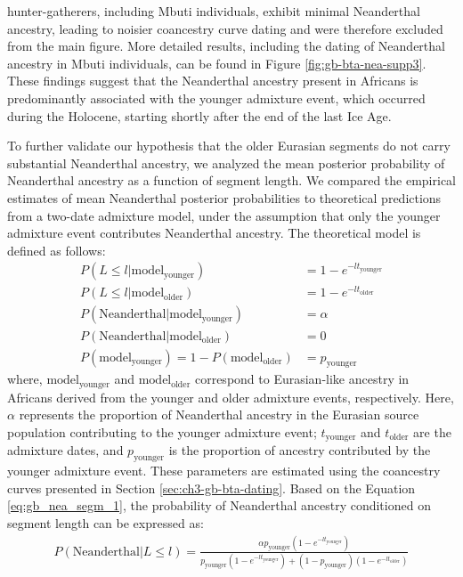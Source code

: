 hunter-gatherers, including Mbuti individuals, exhibit minimal Neanderthal ancestry, leading to noisier coancestry curve dating and were therefore excluded from the main figure. More detailed results, including the dating of Neanderthal ancestry in Mbuti individuals, can be found in Figure \ref{fig:gb-bta-nea-supp3}. These findings suggest that the Neanderthal ancestry present in Africans is predominantly associated with the younger admixture event, which occurred during the Holocene, starting shortly after the end of the last Ice Age.

To further validate our hypothesis that the older Eurasian segments do not carry substantial Neanderthal ancestry, we analyzed the mean posterior probability of Neanderthal ancestry as a function of segment length. We compared the empirical estimates of mean Neanderthal posterior probabilities to theoretical predictions from a two-date admixture model, under the assumption that only the younger admixture event contributes Neanderthal ancestry. The theoretical model is defined as follows:
\begin{align}
    P ( L \leq l | \text{model}_{\text{younger}}) &= 1 - e^{-lt_{\text{younger}}} \nonumber \\
    P ( L \leq l | \text{model}_{\text{older}}) &= 1 - e^{-lt_{\text{older}}} \nonumber \\
    P ( \text{Neanderthal} | \text{model}_{\text{younger}}) &= \alpha \nonumber \\
    P ( \text{Neanderthal} | \text{model}_{\text{older}}) &= 0 \nonumber \\
    P ( \text{model}_{\text{younger}}) = 1 - P ( \text{model}_{\text{older}}) &= p_{\text{younger}}
\label{eq:gb_nea_segm_1}
\end{align}
where, $\text{model}_{\text{younger}}$ and $\text{model}_{\text{older}}$ correspond to Eurasian-like ancestry in Africans derived from the younger and older admixture events, respectively. Here, $\alpha$ represents the proportion of Neanderthal ancestry in the Eurasian source population contributing to the younger admixture event; $t_{\text{younger}}$ and $t_{\text{older}}$ are the admixture dates, and $p_{\text{younger}}$ is the proportion of ancestry contributed by the younger admixture event. These parameters are estimated using the coancestry curves presented in Section \ref{sec:ch3-gb-bta-dating}. Based on the Equation \ref{eq:gb_nea_segm_1}, the probability of Neanderthal ancestry conditioned on segment length can be expressed as:
\begin{align}
    P( \text{Neanderthal} | L \leq l) = \frac{\alpha p_{\text{younger}} (1 - e^{-lt_{\text{younger}}})}{p_{\text{younger}} (1 - e^{-lt_{\text{younger}}}) + (1 - p_{\text{younger}}) (1 - e^{-lt_{\text{older}}})}
\end{align}

